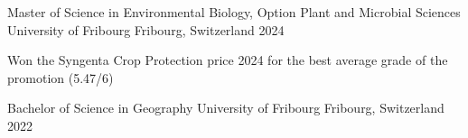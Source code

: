 

\begin{cventries}

  \cventry
    {Master of Science in Environmental Biology, Option Plant and Microbial Sciences} %
    {University of Fribourg} %
    {Fribourg, Switzerland} %
    {2024} %
    {
      \begin{cvitems} %
        \item {Won the Syngenta Crop Protection price 2024 for the best average grade of the promotion (5.47/6)}
      \end{cvitems}
    }

  \cventry
    {Bachelor of Science in Geography} %
    {University of Fribourg} %
    {Fribourg, Switzerland} %
    {2022} %
    {}

\end{cventries}
